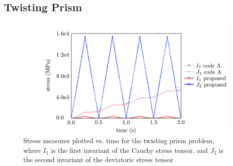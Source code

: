 \FloatBarrier
\subsection{Twisting Prism}

\begin{figure}[!tbhp]
\centering
\includegraphics[scale=0.75]{media/twisted_prism.pdf}
\caption{Stress measures plotted vs. time for the twisting prism problem, where $I_1$ is the first invariant of the Cauchy stress tensor, and $J_2$ is the second invariant of the deviatoric stress tensor}
\label{fig.twisted_prism-cm1}
\end{figure}
\negparafig


